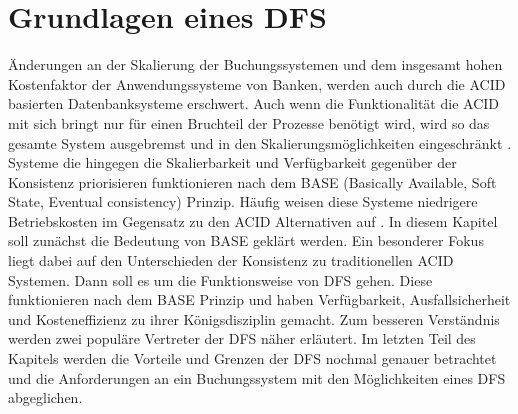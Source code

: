 \documentclass[12pt,oneside,a4paper,parskip]{scrbook}
\begin{document}
\chapter{Grundlagen eines DFS}
Änderungen an der Skalierung der Buchungssystemen und dem insgesamt hohen Kostenfaktor der Anwendungssysteme von Banken, werden auch durch die ACID basierten Datenbanksysteme erschwert. Auch wenn die Funktionalität die ACID mit sich bringt nur für einen Bruchteil der Prozesse benötigt wird, wird so das gesamte System ausgebremst und in den Skalierungsmöglichkeiten eingeschränkt \cite{salt}.
Systeme die hingegen die Skalierbarkeit und Verfügbarkeit gegenüber der Konsistenz priorisieren funktionieren nach dem BASE (Basically Available, Soft State, Eventual consistency) Prinzip. Häufig weisen diese Systeme niedrigere Betriebskosten im Gegensatz zu den ACID Alternativen auf \cite{clusterBASE}.
In diesem Kapitel soll zunächst die Bedeutung von BASE geklärt werden. Ein besonderer Fokus liegt dabei auf den Unterschieden der Konsistenz zu traditionellen ACID Systemen. Dann soll es um die Funktionsweise von DFS gehen. Diese funktionieren nach dem BASE Prinzip und haben Verfügbarkeit, Ausfallsicherheit und Kosteneffizienz zu ihrer Königsdisziplin gemacht. Zum besseren Verständnis werden zwei populäre Vertreter der DFS näher erläutert. Im letzten Teil des Kapitels werden die Vorteile und Grenzen der DFS nochmal genauer betrachtet und die Anforderungen an ein Buchungssystem mit den Möglichkeiten eines DFS abgeglichen.
\end{document}
